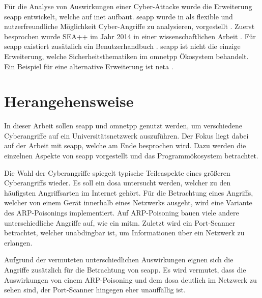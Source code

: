 Für die Analyse von Auswirkungen einer Cyber-Attacke wurde die Erweiterung \gls{seapp} entwickelt, welche auf \gls{inet} aufbaut. \gls{seapp} wurde in  als flexible und nutzerfreundliche Möglichkeit Cyber-Angriffe zu analysieren, vorgestellt  \cite[]{Tiloca2019}. Zuerst besprochen wurde SEA++ im Jahr 2014 in einer wissenschaftlichen Arbeit \cite{Tiloca2014}. Für \gls{seapp} existiert zusätzlich ein Benutzerhandbuch \cite{SEAManual}. \gls{seapp} ist nicht die einzige Erweiterung, welche Sicherheitsthematiken im \gls{omnetpp} Ökosystem behandelt. Ein Beispiel für eine alternative Erweiterung ist \gls{neta} \cite{NETA}.

\section{Herangehensweise}
In dieser Arbeit sollen \gls{seapp} und \gls{omnetpp} genutzt werden, um verschiedene Cyberangriffe auf ein Universitätsnetzwerk auszuführen. Der Fokus liegt dabei auf der Arbeit mit \gls{seapp}, welche am Ende besprochen wird. Dazu werden die einzelnen Aspekte von \gls{seapp} vorgestellt und das Programmökosystem betrachtet.

Die Wahl der Cyberangriffe spiegelt typische Teileaspekte eines größeren Cyberangriffs wieder. Es soll ein \gls{dosa} untersucht werden, welcher zu den häufigsten Angriffsarten im Internet gehört. Für die Betrachtung eines Angriffs, welcher von einem Gerät innerhalb eines Netzwerks ausgeht, wird eine Variante des ARP-Poisonings implementiert. Auf ARP-Poisoning bauen viele andere unterschiedliche Angriffe auf, wie \zB ein \gls{mitm}. Zuletzt wird ein Port-Scanner betrachtet, welcher unabdingbar ist, um Informationen über ein Netzwerk zu erlangen.

Aufgrund der vermuteten unterschiedlichen Auswirkungen eignen sich die Angriffe zusätzlich für die Betrachtung von \gls{seapp}. Es wird vermutet, dass die Auswirkungen von einem ARP-Poisoning und dem \gls{dosa} deutlich im Netzwerk zu sehen sind, der Port-Scanner hingegen eher unauffällig ist.

